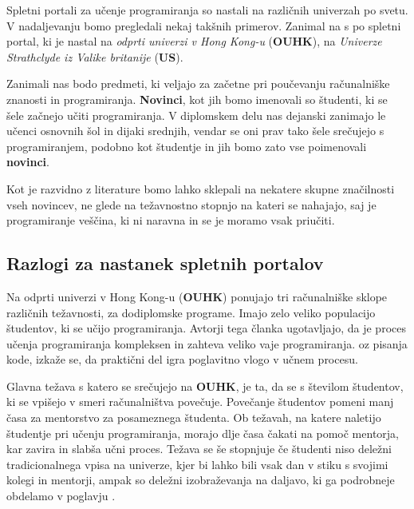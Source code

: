 Spletni portali za učenje programiranja so nastali na različnih
univerzah po svetu. V nadaljevanju bomo pregledali nekaj takšnih
primerov. Zanimal na s po spletni portal, ki je nastal na \emph{odprti
univerzi v Hong Kong-u} (\textbf{OUHK}), na \emph{Univerze Strathclyde iz
Valike britanije} (\textbf{US}). %

Zanimali nas bodo predmeti, ki veljajo za začetne pri poučevanju
računalniške znanosti in programiranja. \textbf{Novinci}, kot jih bomo
imenovali so študenti, ki se šele začnejo učiti programiranja. V
diplomskem delu nas dejanski zanimajo le učenci osnovnih šol in dijaki
srednjih, vendar se oni prav tako šele srečujejo s programiranjem,
podobno kot študentje in jih bomo zato vse poimenovali
\textbf{novinci}.

Kot je razvidno z literature bomo lahko sklepali na nekatere skupne
značilnosti vseh novincev, ne glede na težavnostno stopnjo na kateri
se nahajajo, saj je programiranje veščina, ki ni naravna in se je
moramo vsak priučiti.




\subsection{Razlogi za nastanek spletnih portalov}
\label{sec:razlogi_za_nastanek_SPUP}

Na odprti univerzi v Hong Kong-u (\textbf{OUHK}) ponujajo tri
računalniške sklope različnih težavnosti, za dodiplomske
programe. Imajo zelo veliko populacijo študentov, ki se učijo
programiranja. Avtorji tega članka \cite{ITaLCP_DistanceEdu}
ugotavljajo, da je proces učenja programiranja kompleksen in zahteva
veliko vaje programiranja. oz pisanja kode, izkaže se, da praktični
del igra poglavitno vlogo v učnem procesu.

Glavna težava s katero se srečujejo na \textbf{OUHK}, je ta, da se s
številom študentov, ki se vpišejo v smeri računalništva
povečuje. Povečanje študentov pomeni manj časa za mentorstvo za
posameznega študenta. Ob težavah, na katere naletijo študentje pri
učenju programiranja, morajo dlje časa čakati na pomoč mentorja, kar
zavira in slabša učni proces. Težava se še stopnjuje če študenti niso
deležni tradicionalnega vpisa na univerze, kjer bi lahko bili vsak dan
v stiku s svojimi kolegi in mentorji, ampak so deležni izobraževanja
na daljavo, ki ga podrobneje obdelamo v poglavju
\pageref{sec:Učenje_na_daljavo}.

